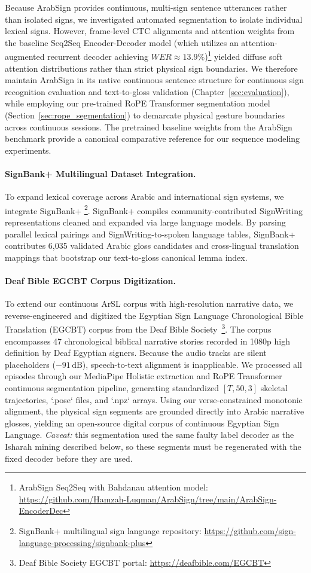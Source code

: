 Because ArabSign provides continuous, multi-sign sentence utterances rather than isolated signs, we investigated automated segmentation to isolate individual lexical signs. However, frame-level CTC alignments and attention weights from the baseline Seq2Seq Encoder-Decoder model (which utilizes an attention-augmented recurrent decoder achieving $W\!E\!R \approx 13.9\%$)\footnote{ArabSign Seq2Seq with Bahdanau attention model: \url{https://github.com/Hamzah-Luqman/ArabSign/tree/main/ArabSign-EncoderDec}} yielded diffuse soft attention distributions rather than strict physical sign boundaries. We therefore maintain ArabSign in its native continuous sentence structure for continuous sign recognition evaluation and text-to-gloss validation (Chapter~\ref{sec:evaluation}), while employing our pre-trained RoPE Transformer segmentation model (Section~\ref{sec:rope_segmentation}) to demarcate physical gesture boundaries across continuous sessions. The pretrained baseline weights from the ArabSign benchmark provide a canonical comparative reference for our sequence modeling experiments.

\paragraph{SignBank+ Multilingual Dataset Integration.}
To expand lexical coverage across Arabic and international sign systems, we integrate SignBank+ \cite{signbankplus}\footnote{SignBank+ multilingual sign language repository: \url{https://github.com/sign-language-processing/signbank-plus}}. SignBank+ compiles community-contributed SignWriting representations cleaned and expanded via large language models. By parsing parallel lexical pairings and SignWriting-to-spoken language tables, SignBank+ contributes 6,035 validated Arabic gloss candidates and cross-lingual translation mappings that bootstrap our text-to-gloss canonical lemma index.

\paragraph{Deaf Bible EGCBT Corpus Digitization.}
To extend our continuous ArSL corpus with high-resolution narrative data, we reverse-engineered and digitized the Egyptian Sign Language Chronological Bible Translation (EGCBT) corpus from the Deaf Bible Society~\cite{deafbible_egcbt}\footnote{Deaf Bible Society EGCBT portal: \url{https://deafbible.com/EGCBT}}. The corpus encompasses 47 chronological biblical narrative stories recorded in 1080p high definition by Deaf Egyptian signers. Because the audio tracks are silent placeholders ($-91\,\text{dB}$), speech-to-text alignment is inapplicable. We processed all episodes through our MediaPipe Holistic extraction and RoPE Transformer continuous segmentation pipeline, generating standardized $[T, 50, 3]$ skeletal trajectories, `.pose` files, and `.npz` arrays. Using our verse-constrained monotonic alignment, the physical sign segments are grounded directly into Arabic narrative glosses, yielding an open-source digital corpus of continuous Egyptian Sign Language. \emph{Caveat:} this segmentation used the same faulty label decoder as the Isharah mining described below, so these segments must be regenerated with the fixed decoder before they are used.

